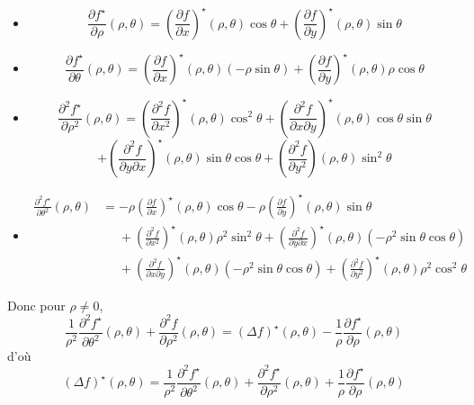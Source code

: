 \begin{itemize}
    \item \[
            \frac{\partial f^\star}{\partial \rho} (\rho, \theta)= \left( \frac{\partial f}{\partial x}  \right)^\star (\rho, \theta)\cos \theta+ \left( \frac{\partial f}{\partial y}  \right)^\star (\rho, \theta)\sin\theta
        \]
    \item \[
            \frac{\partial f^\star}{\partial \theta}(\rho, \theta)= \left( \frac{\partial f}{\partial x}  \right)^\star (\rho, \theta)(-\rho\sin\theta)+ \left( \frac{\partial f}{\partial y}  \right)^\star (\rho, \theta)\rho\cos\theta
        \]
    \item \[
        \frac{\partial^2 f^\star}{\partial \rho^2} (\rho, \theta)= \left( \frac{\partial^2f}{\partial x^2}  \right)^\star (\rho, \theta)\cos^2\theta + \left( \frac{\partial^2f}{\partial x\partial y}  \right)^\star (\rho, \theta)\cos\theta\sin\theta \]\[ + \left( \frac{\partial^2 f}{\partial y\partial x}  \right)^\star(\rho, \theta)\sin\theta\cos\theta + \left( \frac{\partial^2f}{\partial y^2}  \right)(\rho, \theta)\sin^2\theta
        \]
    \item \begin{align*}
            \frac{\partial^2f^\star}{\partial \theta^2} (\rho, \theta) &=
            -\rho \left( \frac{\partial f}{\partial x}  \right)^\star(\rho, \theta)\cos \theta -\rho \left( \frac{\partial f}{\partial y}  \right)^\star (\rho, \theta)\sin\theta \\
                                                                       &\phantom{= } + \left( \frac{\partial ^2f}{\partial x^2}  \right)^\star (\rho, \theta)\rho^2\sin^2\theta+ \left( \frac{\partial ^2f}{\partial y\partial x}  \right)^\star (\rho, \theta)(-\rho^2\sin\theta\cos\theta) \\ 
                                                                       &\phantom{= } + \left( \frac{\partial^2f}{\partial x\partial y}  \right)^\star (\rho, \theta)(-\rho^2\sin\theta\cos\theta)+ \left( \frac{\partial^2f}{\partial y^2}  \right)^\star (\rho, \theta)\rho^2\cos^2\theta
    \end{align*}
\end{itemize}

Donc pour $\rho \neq 0$, \[
    \frac{1}{\rho^2} \frac{\partial^2f^\star}{\partial\theta^2} (\rho, \theta)+ \frac{\partial^2f}{\partial \rho^2} (\rho, \theta)=(\Delta f)^\star (\rho, \theta)-\frac1\rho\frac{\partial f^\star}{\partial \rho}(\rho, \theta)
\]
d'où \[
    (\Delta f)^\star (\rho, \theta)=\frac1{\rho^2}\frac{\partial^2f^\star}{\partial\theta^2}(\rho, \theta)+\frac{\partial^2f^\star}{\partial \rho^2}(\rho, \theta)+\frac1\rho \frac{\partial f^\star}{\partial \rho}(\rho, \theta)
\]

